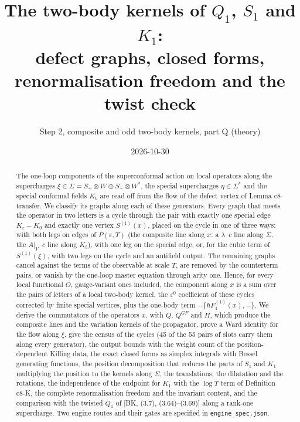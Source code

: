 \documentclass[11pt]{article}
\title{The two-body kernels of $Q_1$, $S_1$ and $K_1$:\\ defect graphs, closed forms, renormalisation freedom and the twist check}
\author{Step 2, composite and odd two-body kernels, part Q (theory)}
\date{2026-10-30}
\numberwithin{equation}{section}
\theoremstyle{plain}
\theoremstyle{definition}
\begin{document}
\maketitle

\begin{abstract}
The one-loop components of the superconformal action on local operators along the supercharges $\xi\in\Sigma=S_+\otimes W\oplus S_-\otimes W^*$, the special supercharges $\eta\in\Sigma^*$ and the special conformal fields $K_b$ are read off from the flow of the defect vertex of Lemma c8-transfer. We classify its graphs along each of these generators. Every graph that meets the operator in two letters is a cycle through the pair with exactly one special edge $K_\varepsilon-K_0$ and exactly one vertex $S^{(1)}(x)$, placed on the cycle in one of three ways: with both legs on edges of $P(\varepsilon,T)$ (the composite line along $x$: a $\lambda$--$c$ line along $\Sigma$, the $A|_V$--$c$ line along $K_b$), with one leg on the special edge, or, for the cubic term of $S^{(1)}(\xi)$, with two legs on the cycle and an antifield output. The remaining graphs cancel against the terms of the observable at scale $T$, are removed by the counterterm pairs, or vanish by the one-loop master equation through arity one. Hence, for every local functional $O$, gauge-variant ones included, the component along $x$ is a sum over the pairs of letters of a local two-body kernel, the $\varepsilon^0$ coefficient of these cycles corrected by finite special vertices, plus the one-body term $-\{\hbar F_1^{(1)}(x),-\}$. We derive the commutators of the operators $x.$ with $Q$, $Q^{GF}$ and $H$, which produce the composite lines and the variation kernels of the propagator, prove a Ward identity for the flow along $\xi$, give the census of the cycles (45 of the 55 pairs of slots carry them along every generator), the output bounds with the weight count of the position-dependent Killing data, the exact closed forms as simplex integrals with Bessel generating functions, the position decomposition that reduces the parts of $S_1$ and $K_1$ multiplying the position to the kernels along $\Sigma$, the translations, the dilatation and the rotations, the independence of the endpoint for $K_1$ with the $\log T$ term of Definition c8-K, the complete renormalisation freedom and the invariant content, and the comparison with the twisted $Q_1$ of [BK, (3.7), (3.64)--(3.69)] along a rank-one supercharge. Two engine routes and their gates are specified in \texttt{engine\_spec.json}.
\end{abstract}

\tableofcontents
\end{document}
